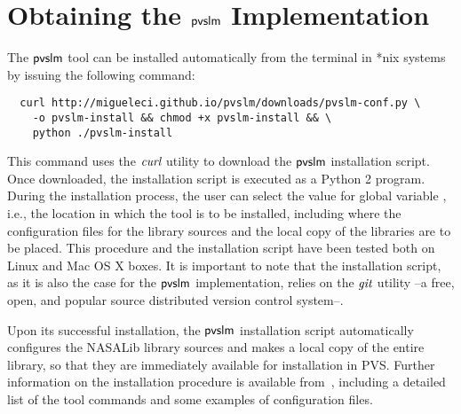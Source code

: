 \section{Obtaining the $\textsf{pvslm}$ Implementation}
\label{sec.install}

The $\textsf{pvslm}$ tool can be installed automatically from the terminal in
*nix systems by issuing the following command:
%
{\small\begin{verbatim}
  curl http://migueleci.github.io/pvslm/downloads/pvslm-conf.py \
    -o pvslm-install && chmod +x pvslm-install && \
    python ./pvslm-install
\end{verbatim}}
%
This command uses the $\textit{curl}$ utility to download the $\textsf{pvslm}$
installation script. Once downloaded, the installation script is
executed as a Python 2 program.  During the installation process, the
user can select the value for global variable \cde{PVS\_PATH}, i.e.,
the location in which the tool is to be installed, including where the
configuration files for the library sources and the local copy of the
libraries are to be placed. This procedure and the installation script
have been tested both on Linux and Mac OS X boxes. It is important to
note that the installation script, as it is also the case for the
$\textsf{pvslm}$ implementation, relies on the $\textit{git}$ utility --a free, open,
and popular source distributed version control system--.

Upon its successful installation, the $\textsf{pvslm}$ installation script
automatically configures the NASALib library sources and makes a local
copy of the entire library, so that they are immediately available for
installation in PVS.  Further information on the installation
procedure is available from~\cite{pvslm}, including a detailed list of
the tool commands and some examples of configuration files.
